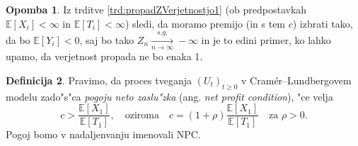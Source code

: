 \documentclass[12pt, a4paper, reqno]{amsart}
\theoremstyle{definition}
\newtheorem{definicija}{Definicija}[section]
\newtheorem{opomba}[definicija]{Opomba}
\theoremstyle{plain}
\newcommand{\N}{\mathbb{N}}
\newcommand{\E}{\mathbb{E}}
\newcommand{\Prob}{\mathbb{P}}
\newcommand{\1}{\mathds{1}}
\begin{document}
        \begin{opomba}
            Iz trditve \ref{trd:propadZVerjetnostjo1} (ob predpostavkah $\E\left[X_i\right] < \infty$
            in $\E\left[T_i\right] < \infty$) sledi, da moramo premijo (in s tem $c$) izbrati tako, da bo 
            $\E\left[Y_i\right] < 0$, saj bo tako $Z_{n} \xrightarrow[n\to\infty]{s.g.}-\infty$
            in je to edini primer, ko lahko upamo, da verjetnost propada ne bo
            enaka 1.
            \label{op:izbiraPremije}
        \end{opomba}
    
%
%
%

        \begin{definicija}
            Pravimo, da proces tveganja $(U_t)_{t\geq0}$ v Cramér--Lundbergovem modelu
             zado"s"ca \textit{pogoju neto zaslu"zka} (ang. \textit{net profit condition}), "ce velja 
            \begin{equation*}
                c > \frac{\E\left[X_1\right]}{\E\left[T_1\right]}, \quad \text{oziroma} \quad 
                c = (1 + \rho)\frac{\E\left[X_1\right]}{\E\left[T_1\right]} \quad \text{za $\rho > 0$}.
            \end{equation*}
            Pogoj bomo v nadaljenvanju imenovali NPC.
            \label{def:NPC}
        \end{definicija}
\end{document}
